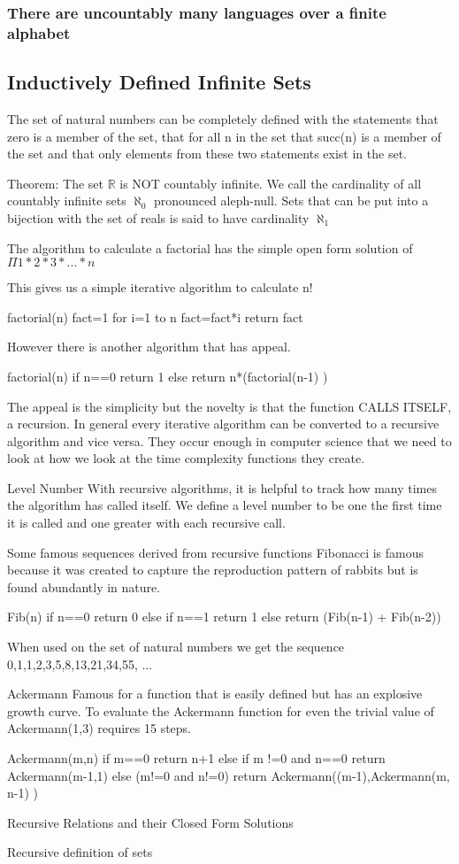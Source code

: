         \subsubsection {There are uncountably many languages over a finite alphabet}
    \subsection {Inductively Defined Infinite Sets}
The set of natural numbers can be completely defined with the statements that zero is a member of the set, that for all n in the set that succ(n) is a member of the set and that only elements from these two statements exist in the set. 


Theorem: The set $\mathbb{R}$ is NOT countably infinite. We call the cardinality of all countably infinite sets $\aleph _0$ pronounced aleph-null. Sets that can be put into a bijection with the set of reals is said to have cardinality $\aleph_1$


The algorithm to calculate a factorial has the simple open form solution of 
$\Pi{1*2*3* ... *n}$

This gives us a simple iterative algorithm to calculate n!

factorial(n)
fact=1
for i=1 to n
    fact=fact*i
return fact

However there is another algorithm that has appeal.

factorial(n)
if n==0
    return 1
else
    return n*(factorial(n-1) )

The appeal is the simplicity but the novelty is that the function CALLS ITSELF, a recursion. In general every iterative algorithm can be converted to a recursive algorithm and vice versa. They occur enough in computer science that we need to look at how we look at the time complexity functions they create.

Level Number
With recursive algorithms, it is helpful to track how many times the algorithm has called itself. We define a level number to be one the first time it is called and one greater with each recursive call.

Some famous sequences derived from recursive functions
Fibonacci is famous because it was created to capture the reproduction pattern of rabbits but is found abundantly in nature.

Fib(n)
if n==0
    return 0
else if n==1
    return 1
else 
    return (Fib(n-1) + Fib(n-2))

When used on the set of natural numbers we get the sequence
0,1,1,2,3,5,8,13,21,34,55, ...

Ackermann
Famous for a function that is easily defined but has an explosive growth curve. To evaluate the Ackermann function for even the trivial value of Ackermann(1,3) requires 15 steps.

Ackermann(m,n)
if m==0
    return n+1
else if m !=0 and n==0
    return Ackermann(m-1,1)
else (m!=0 and n!=0)
    return Ackermann((m-1),Ackermann(m, n-1) )


Recursive Relations and their Closed Form Solutions

Recursive definition of sets

\newpage
